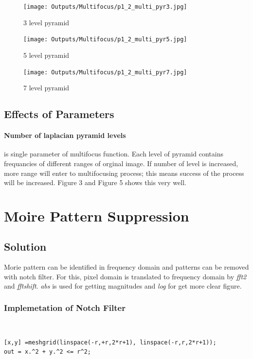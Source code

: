 \documentclass[12pt]{article}
\begin{document}
\begin{figure}[H]
\centering
\texttt{[image: Outputs/Multifocus/p1\_2\_multi\_pyr3.jpg]}
\caption{3 level pyramid}
\end{figure}

\begin{figure}[H]
\centering
\texttt{[image: Outputs/Multifocus/p1\_2\_multi\_pyr5.jpg]}
\caption{5 level pyramid}
\end{figure}

\begin{figure}[H]
\centering
\texttt{[image: Outputs/Multifocus/p1\_2\_multi\_pyr7.jpg]}
\caption{7 level pyramid}
\end{figure}

\subsection{Effects of Parameters}
\paragraph{Number of laplacian pyramid levels}is single parameter of multifocus function. Each level of pyramid contains frequancies of different ranges of orginal image. If number of level is increased, more range will enter to multifocusing process; this means success of the process will be increased. Figure 3 and Figure 5 shows this very well.

\section{Moire Pattern Suppression}
\subsection{Solution}
Morie pattern can be identified in frequency domain and patterns can be removed with notch filter. For this, pixel domain is translated to frequency domain by \textit{fft2} and \textit{fftshift}. \textit{abs} is used for getting magnitudes and \textit{log} for get more clear figure. 
\subsubsection{Implemetation of Notch Filter}

\\
\begin{lstlisting}
[x,y] =meshgrid(linspace(-r,+r,2*r+1), linspace(-r,r,2*r+1));
out = x.^2 + y.^2 <= r^2;
\end{lstlisting}
\end{document}
